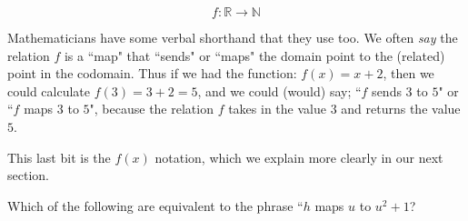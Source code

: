 \documentclass{ximeraXloud}
\begin{document}
\[
    f: \mathbb{R} \rightarrow \mathbb{N}
\]

Mathematicians have some verbal shorthand that they use too. We often \textit{say} the relation $f$ is a ``map" that ``sends" or ``maps" the domain point to the (related) point in the codomain. Thus if we had the function: $f(x) = x + 2$, then we could calculate $f(3) = 3 + 2 = 5$, and we could (would) say; ``$f$ sends $3$ to $5$" or ``$f$ maps $3$ to $5$", because the relation $f$ takes in the value $3$ and returns the value $5$.

This last bit is the $f(x)$ notation, which we explain more clearly in our next section.


\begin{problem}
    Which of the following are equivalent to the phrase ``$h$ maps $u$ to $u^2 + 1$?
    \begin{selectAll}
    \end{selectAll}
\end{problem}
\end{document}
